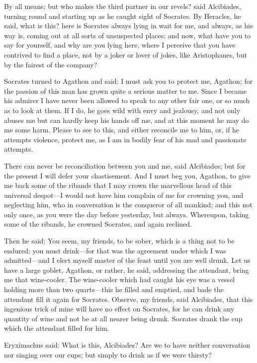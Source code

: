 \para[127] By all means; but who makes the third partner in our revels? said Alcibiades, turning round and starting up as he caught sight of Socrates. By Heracles, he said, what is this? here is Socrates always lying in wait for me, and always, as his way is, coming out at all sorts of unsuspected places: and now, what have you to say for yourself, and why are you lying here, where I perceive that you have contrived to find a place, not by a joker or lover of jokes, like Aristophanes, but by the fairest of the company?

\para[128] Socrates turned to Agathon and said: I must ask you to protect me, Agathon; for the passion of this man has grown quite a serious matter to me. Since I became his admirer I have never been allowed to speak to any other fair one, or so much as to look at them. If I do, he goes wild with envy and jealousy, and not only abuses me but can hardly keep his hands off me, and at this moment he may do me some harm. Please to see to this, and either reconcile me to him, or, if he attempts violence, protect me, as I am in bodily fear of his mad and passionate attempts.

\para[129] There can never be reconciliation between you and me, said Alcibiades; but for the present I will defer your chastisement. And I must beg you, Agathon, to give me back some of the ribands that I may crown the marvellous head of this universal despot---I would not have him complain of me for crowning you, and neglecting him, who in conversation is the conqueror of all mankind; and this not only once, as you were the day before yesterday, but always. Whereupon, taking some of the ribands, he crowned Socrates, and again reclined.

\para[130] Then he said: You seem, my friends, to be sober, which is a thing not to be endured; you must drink---for that was the agreement under which I was admitted---and I elect myself master of the feast until you are well drunk. Let us have a large goblet, Agathon, or rather, he said, addressing the attendant, bring me that wine-cooler. The wine-cooler which had caught his eye was a vessel holding more than two quarts---this he filled and emptied, and bade the attendant fill it again for Socrates. Observe, my friends, said Alcibiades, that this ingenious trick of mine will have no effect on Socrates, for he can drink any quantity of wine and not be at all nearer being drunk. Socrates drank the cup which the attendant filled for him.

\para[131] Eryximachus said: What is this, Alcibiades? Are we to have neither conversation nor singing over our cups; but simply to drink as if we were thirsty?

